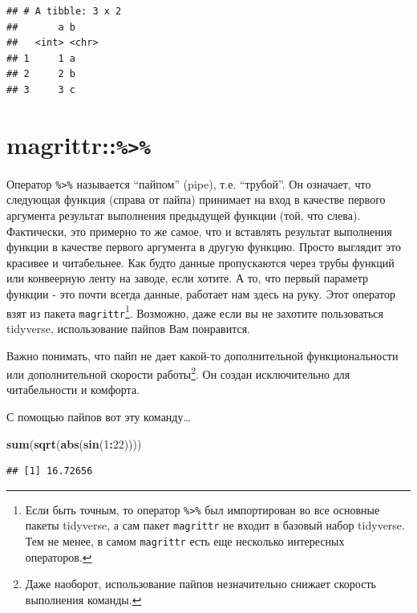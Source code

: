 \documentclass[]{book}
\newenvironment{Shaded}{\begin{snugshade}}{\end{snugshade}}
\newcommand{\KeywordTok}[1]{\textcolor[rgb]{0.13,0.29,0.53}{\textbf{#1}}}
\newcommand{\DecValTok}[1]{\textcolor[rgb]{0.00,0.00,0.81}{#1}}
\newcommand{\OperatorTok}[1]{\textcolor[rgb]{0.81,0.36,0.00}{\textbf{#1}}}
\newcommand{\NormalTok}[1]{#1}
\begin{document}
\begin{verbatim}
## # A tibble: 3 x 2
##       a b    
##   <int> <chr>
## 1     1 a    
## 2     2 b    
## 3     3 c
\end{verbatim}

\section{\texorpdfstring{magrittr::\texttt{\%\textgreater{}\%}}{magrittr::\%\textgreater{}\%}}\label{pipe}

Оператор \texttt{\%\textgreater{}\%} называется ``пайпом'' (pipe), т.е.
``трубой''. Он означает, что следующая функция (справа от пайпа)
принимает на вход в качестве первого аргумента результат выполнения
предыдущей функции (той, что слева). Фактически, это примерно то же
самое, что и вставлять результат выполнения функции в качестве первого
аргумента в другую функцию. Просто выглядит это красивее и читабельнее.
Как будто данные пропускаются через трубы функций или конвеерную ленту
на заводе, если хотите. А то, что первый параметр функции - это почти
всегда данные, работает нам здесь на руку. Этот оператор взят из пакета
\texttt{magrittr}\footnote{Если быть точным, то оператор
  \texttt{\%\textgreater{}\%} был импортирован во все основные пакеты
  tidyverse, а сам пакет \texttt{magrittr} не входит в базовый набор
  tidyverse. Тем не менее, в самом \texttt{magrittr} есть еще несколько
  интересных операторов.}. Возможно, даже если вы не захотите
пользоваться tidyverse, использование пайпов Вам понравится.

Важно понимать, что пайп не дает какой-то дополнительной
функциональности или дополнительной скорости работы\footnote{Даже
  наоборот, использование пайпов незначительно снижает скорость
  выполнения команды.}. Он создан исключительно для читабельности и
комфорта.

С помощью пайпов вот эту команду\ldots{}

\begin{Shaded}
\begin{Highlighting}[]
\KeywordTok{sum}\NormalTok{(}\KeywordTok{sqrt}\NormalTok{(}\KeywordTok{abs}\NormalTok{(}\KeywordTok{sin}\NormalTok{(}\DecValTok{1}\OperatorTok{:}\DecValTok{22}\NormalTok{))))}
\end{Highlighting}
\end{Shaded}

\begin{verbatim}
## [1] 16.72656
\end{verbatim}
\end{document}
